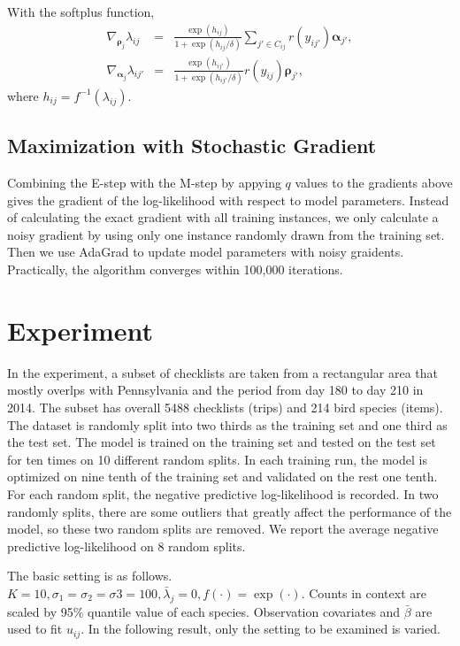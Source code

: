 \documentclass{article}
\newcommand{\wt}{\boldsymbol{\rho}}
\newcommand{\emb}{\boldsymbol{\alpha}}
\begin{document}
With the softplus function, 
\begin{eqnarray}
\nabla_{\wt_j} \lambda_{ij} &=& \frac{\exp(h_{ij})}{1 + \exp(h_{ij} / \delta)} \sum_{j' \in C_{ij}} r(y_{ij'}) \emb_{j'}, \\
\nabla_{\emb_{j}} \lambda_{ij'} &=& \frac{\exp(h_{ij'})}{1 + \exp(h_{ij'} / \delta)}  r(y_{ij}) \wt_{j'},
\end{eqnarray}
where $h_{ij} = f^{-1}(\lambda_{ij})$.



\subsection{Maximization with Stochastic Gradient}

Combining the E-step with the M-step by appying $q$ values to the gradients above gives the gradient of the log-likelihood with respect to model parameters. 
Instead of calculating the exact gradient with all training instances, we only calculate a noisy gradient by using only one instance randomly drawn from the 
training set. Then we use AdaGrad to update model parameters with noisy graidents. Practically, the algorithm converges within 100,000 iterations. 

\section{Experiment}

In the experiment, a subset of checklists are taken from a rectangular area that mostly overlps with Pennsylvania and the period from day 180 to day 210 in 2014. The 
subset has  overall 5488 checklists (trips)
and 214 bird species (items). The dataset is randomly split into two thirds as the training set and one third as the test set. The model is trained on the training set and tested on the test set for ten times on 10 different random splits. In each training run, the model is optimized on nine tenth of the training set and validated on the rest one tenth. For each random split, the negative predictive log-likelihood is recorded. In two randomly splits, there are some outliers that greatly affect the performance of the model, so these two random splits are removed. We report the average negative predictive log-likelihood on 8 random splits.

The basic setting is as follows. $K = 10, \sigma_1 = \sigma_2 = \sigma3 = 100, \bar{\lambda}_j = 0, f(\cdot) = \exp(\cdot)$. Counts in context are scaled by 95\% quantile value of each species. Observation covariates and $\bar{\beta}$ are used to fit $u_{ij}$. In the following result, only the setting to be examined is varied. 
\end{document}
